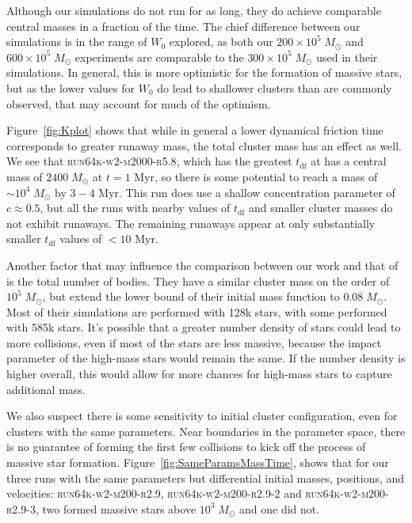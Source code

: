 \documentclass{princeton_astro_thesis}
\newcommand\Msun{\; M_\odot}
\newcommand\msun{\; M_\odot}
\newcommand\Myr{\mbox{ Myr}}
\numberwithin{equation}{section}
\begin{document}
Although our simulations do not run for as long, they do achieve comparable central masses in a fraction of the time.  The chief difference between our simulations is in the range of $W_{0}$ explored, as both our $200 \times 10^5 \msun $ and $600 \times 10^5 \msun$ experiments are comparable to the $300 \times 10^5 \msun$ used in their simulations.  In general, this is more optimistic for the formation of massive stars, but as the lower values for $W_{0}$ do lead to shallower clusters than are commonly observed, that may account for much of the optimism. 

Figure~\ref{fig:Kplot} shows that while in general a lower dynamical friction time corresponds to greater runaway mass, the total cluster mass has an effect as well. We see that \textsc{run64k-w2-m2000-r5.8}, which has the greatest $t_{\mathrm{df}}$ at  has a central mass of $2400 \Msun$ at $t = 1 \Myr$, so there is some potential to reach a mass of $\sim 10^4 \Msun$ by $3-4 \Myr$.  This run does use a shallow concentration parameter of $c \approx 0.5$, but all the runs with nearby values of $t_{\mathrm{df}}$ and smaller cluster masses do not exhibit runaways.  The remaining runaways appear at only substantially smaller $t_{\mathrm{df}}$ values of $< 10 \Myr$.

Another factor that may influence the comparison between our work and that of \citet{2004SPZ} is the total number of bodies. They have a similar cluster mass on the order of $10^{5} \Msun$, but extend the lower bound of their initial mass function to $0.08 \Msun$.  Most of their simulations are performed with 128k stars, with some performed with 585k stars.  It's possible that a greater number density of stars could lead to more collisions, even if most of the stars are less massive, because the impact parameter of the high-mass stars would remain the same. If the number density is higher overall, this would allow for more chances for high-mass stars to capture additional mass.

We also suspect there is some sensitivity to initial cluster configuration, even for clusters with the same parameters. Near boundaries in the parameter space, there is no guarantee of forming the first few collisions to kick off the process of massive star formation. Figure~\ref{fig:SameParamsMassTime}, shows that for our three runs with the same parameters but differential initial masses, positions, and velocities: \textsc{run64k-w2-m200-r2.9, run64k-w2-m200-r2.9-2} and \textsc{run64k-w2-m200-r2.9-3}, two formed massive stars above $10^3 \Msun$ and one did not.
\end{document}
